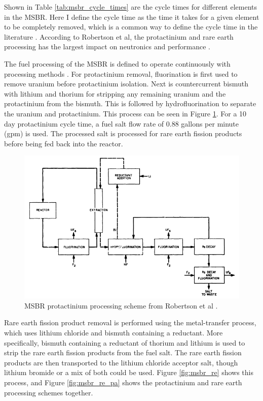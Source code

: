 
Shown in Table \ref{tab:msbr_cycle_times} are the cycle times for different elements in the MSBR.
Here I define the cycle time as the time it takes for a given element to be completely removed, which is a common way to define the cycle time in the literature \cite{betzler_molten_2017, rykhlevskii_modeling_2019, robertson_conceptual_1971}.
According to Robertson et al, the protactinium and rare earth processing has the largest impact on neutronics and performance \cite{robertson_conceptual_1971}.

The fuel processing of the MSBR is defined to operate continuously with processing methods \cite{robertson_conceptual_1971}. For protactinium removal, fluorination is first used to remove uranium before protactinium isolation. Next is countercurrent bismuth with lithium and thorium for stripping any remaining uranium and the protactinium from the bismuth. This is followed by hydrofluorination to separate the uranium and protactinium. This process can be seen in Figure \ref{fig:msbr_pa}. For a 10 day protactinium cycle time, a fuel salt flow rate of 0.88 gallons per minute (gpm) is used. The processed salt is processed for rare earth fission products before being fed back into the reactor.
\begin{figure}[H]
  \centering
  \includegraphics[scale=0.55]{images/msbr_pa_robertson.PNG}
  \caption{MSBR protactinium processing scheme from Robertson et al \cite{robertson_conceptual_1971}.}
   \label{fig:msbr_pa}
\end{figure}

Rare earth fission product removal is performed using the metal-transfer process, which uses lithium chloride and bismuth containing a reductant. More specifically, bismuth containing a reductant of thorium and lithium is used to strip the rare earth fission products from the fuel salt. The rare earth fission products are then transported to the lithium chloride acceptor salt, though lithium bromide or a mix of both could be used. Figure \ref{fig:msbr_re} shows this process, and Figure \ref{fig:msbr_re_pa} shows the protactinium and rare earth processing schemes together.

